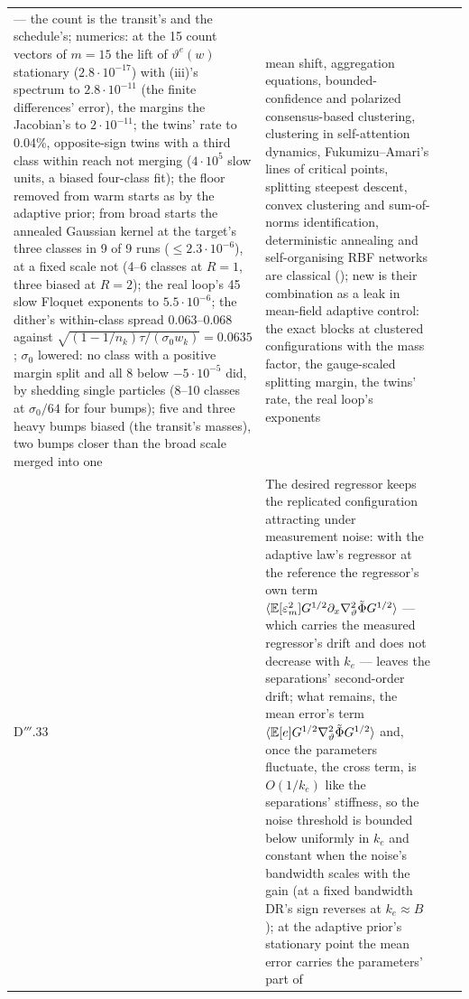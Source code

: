 {\begin{longtable}{@{}>{\raggedright\arraybackslash}p{}>{\raggedright\arraybackslash}p{}%
>{\raggedright\arraybackslash}p{}>{\raggedright\arraybackslash}p{}@{}}
--- the count is the transit's and the schedule's; numerics: at the 15 count vectors of $m = 15$ the lift of
$\vartheta^e(w)$ stationary ($2.8\cdot10^{-17}$) with (iii)'s spectrum to $2.8\cdot10^{-11}$ (the finite differences'
error), the margins the Jacobian's to $2\cdot10^{-11}$; the twins' rate to 0.04\%, opposite-sign twins with a third
class within reach not merging ($4\cdot10^5$ slow units, a biased four-class fit); the floor removed from warm starts
as by the adaptive prior; from broad starts the annealed Gaussian kernel at the target's three classes in 9 of 9 runs
($\le2.3\cdot10^{-6}$), at a fixed scale not (4--6 classes at $R = 1$, three biased at $R = 2$); the real loop's 45
slow Floquet exponents to $5.5\cdot10^{-6}$; the dither's within-class spread 0.063--0.068 against
$\sqrt{(1 - 1/n_k)\tau/(\sigma_0w_k)} = 0.0635$; $\sigma_0$ lowered: no class with a positive margin split and all 8
below $-5\cdot10^{-5}$ did, by shedding single particles (8--10 classes at $\sigma_0/64$ for four bumps); five and
three heavy bumps biased (the transit's masses), two bumps closer than the broad scale merged into one
& mean shift, aggregation equations, bounded-confidence and polarized consensus-based clustering, clustering in
self-attention dynamics, Fukumizu--Amari's lines of critical points, splitting steepest descent, convex clustering and
sum-of-norms identification, deterministic annealing and self-organising RBF networks are classical (\cite{S60}); new
is their combination as a leak in mean-field adaptive control: the exact blocks at clustered configurations with the
mass factor, the gauge-scaled splitting margin, the twins' rate, the real loop's exponents\\
\addlinespace[0.5pt]
D$'''$.33 & The desired regressor keeps the replicated configuration attracting under measurement noise: with the
adaptive law's regressor at the reference the regressor's own term
$\langle\mathbb{E}[\varepsilon_m^2]G^{1/2}\partial_x\nabla^2_\vartheta\tilde\Phi G^{1/2}\rangle$ --- which carries the
measured regressor's drift and does not decrease with $k_e$ --- leaves the separations' second-order drift; what
remains, the mean error's term $\langle\mathbb{E}[e]G^{1/2}\nabla^2_\vartheta\tilde\Phi G^{1/2}\rangle$ and, once the
parameters fluctuate, the cross term, is $O(1/k_e)$ like the separations' stiffness, so the noise threshold is bounded
below uniformly in $k_e$ and constant when the noise's bandwidth scales with the gain (at a fixed bandwidth DR's sign
reverses at $k_e\approx B$); at the adaptive prior's stationary point the mean error carries the parameters' part of

\end{longtable}}
